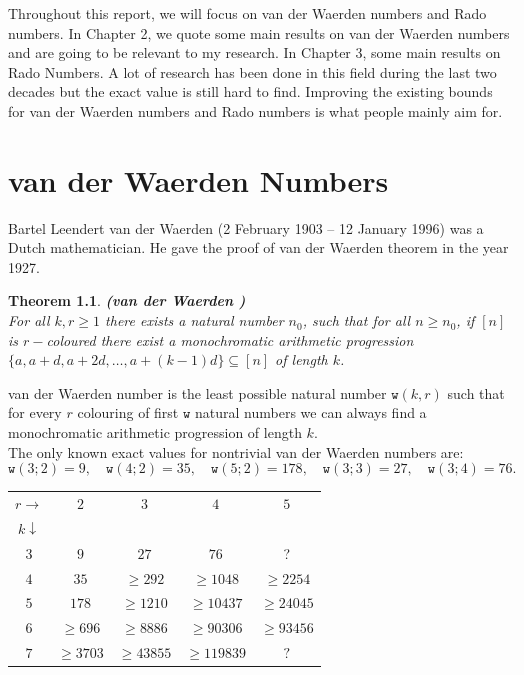 \documentclass[12pt]{report}
\def\w{\mathtt w}
\newtheorem{thm}{Theorem}[chapter]
\begin{document}
\noindent Throughout this report, we will focus on van der Waerden numbers and Rado numbers. In Chapter 2, we quote some main results on van der Waerden numbers and are going to be relevant to my research. In Chapter 3, some main results on Rado Numbers. A lot of research has been done in this field during the last two decades but the exact value is still hard to find. Improving the existing bounds for van der Waerden numbers and Rado numbers is what people mainly aim for.
  

\chapter{van der Waerden Numbers}

\noindent Bartel Leendert van der Waerden (2 February 1903 -- 12 January 1996) was a Dutch mathematician. He gave the proof of van der Waerden theorem in the year 1927.

\begin{thm} {\bf (van der Waerden \cite{RT})} \\[5pt] 
For all $k,r \geq 1$ there exists a natural number $n_{0}$, such that for all $n \geq n_{0}$, if $[n]$ is $r-$coloured there exist a monochromatic arithmetic progression  $\big\{a,a+d,a+2d, \ldots ,a+(k-1)d\big\} \subseteq [n]$ of length $k$.
\end{thm}

\noindent van der Waerden number is the least possible natural number ${\w}(k,r) $ such that for every $r$ colouring of first $\w$ natural numbers we can always find a monochromatic arithmetic progression of length $k$. \\
                                        
\noindent The only known exact values for nontrivial van der Waerden numbers are:
\[\w(3;2)=9, \quad \w(4;2)=35, \quad \w(5;2)=178, \quad \w(3;3)=27, \quad\w(3;4)=76. \]

\begin{center}
\begin{tabular}{|c||c|c|c|c|} \hline
$r \rightarrow$ & $2$ & $3$ & $4$ & $5$ \\ 
$k \downarrow$ & & & & \\ \hline \hline
$3$ & $9$ & $27$ & $76$ & ? \\ \hline
$4$ & $35$ & $\ge 292$ & $\ge 1048$ & $\ge 2254$ \\ \hline
$5$ & $178$ & $\ge 1210$ & $\ge 10437$ & $\ge 24045$ \\ \hline
$6$ & $\ge 696$ & $\ge 8886$ & $\ge 90306$ & $\ge 93456$ \\ \hline
$7$ & $\ge 3703$ & $\ge 43855$ & $\ge 119839$ & $?$ \\ \hline
\end{tabular}
\end{center}
\end{document}
